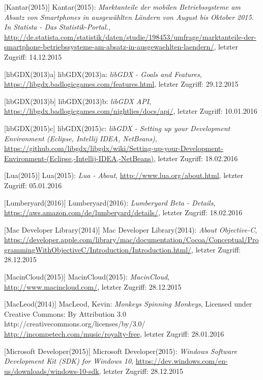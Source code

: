 \begin{thebibliography}{}
[Kantar(2015)] Kantar(2015): \emph{Marktanteile der mobilen Betriebssysteme am Absatz von Smartphones in ausgewählten Ländern von August bis Oktober 2015. In Statista - Das Statistik-Portal.},
\url{http://de.statista.com/statistik/daten/studie/198453/umfrage/marktanteile-der-smartphone-betriebssysteme-am-absatz-in-ausgewaehlten-laendern/}, letzter Zugriff: 14.12.2015

[libGDX(2013)a] libGDX(2013)a: \emph{libGDX - Goals and Features},
\url{https://libgdx.badlogicgames.com/features.html}, letzter Zugriff: 29.12.2015

[libGDX(2013)b] libGDX(2013)b: \emph{libGDX API},
\url{https://libgdx.badlogicgames.com/nightlies/docs/api/}, letzter Zugriff: 10.01.2016

[libGDX(2015)c] libGDX(2015)c: \emph{libGDX - Setting up your Development Environment (Eclipse, Intellij IDEA, NetBeans)},
\url{https://github.com/libgdx/libgdx/wiki/Setting-up-your-Development-Environment-(Eclipse,-Intellij-IDEA,-NetBeans)}, letzter Zugriff: 18.02.2016

[Lua(2015)] Lua(2015): \emph{Lua - About},
\url{http://www.lua.org/about.html}, letzter Zugriff: 05.01.2016

[Lumberyard(2016)] Lumberyard(2016): \emph{Lumberyard Beta - Details},
\url{https://aws.amazon.com/de/lumberyard/details/}, letzter Zugriff: 18.02.2016

[Mac Developer Library(2014)] Mac Developer Library(2014): \emph{About Objective-C},
\url{https://developer.apple.com/library/mac/documentation/Cocoa/Conceptual/ProgrammingWithObjectiveC/Introduction/Introduction.html/}, letzter Zugriff: 28.12.2015

[MacinCloud(2015)] MacinCloud(2015): \emph{MacinCloud},
\url{http://www.macincloud.com/}, letzter Zugriff: 28.12.2015

[MacLeod(2014)] MacLeod, Kevin:
\emph{Monkeys Spinning Monkeys},
Licensed under Creative Commons: By Attribution 3.0
http://creativecommons.org/licenses/by/3.0/
\url{http://incompetech.com/music/royalty-free}, letzter Zugriff: 28.01.2016

[Microsoft Developer(2015)] Microsoft Developer(2015): \emph{Windows Software Development Kit (SDK) for Windows 10},
\url{https://dev.windows.com/en-us/downloads/windows-10-sdk}, letzter Zugriff: 28.12.2015


\end{thebibliography}

